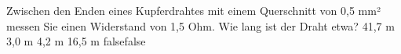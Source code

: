     {Zwischen den Enden eines Kupferdrahtes mit einem Querschnitt von 0,5 mm² messen Sie einen Widerstand von 1,5 Ohm. Wie lang ist der Draht etwa?}
    {41,7 m}
    {3,0 m}
    {4,2 m}
    {16,5 m}
    {false}{false}
